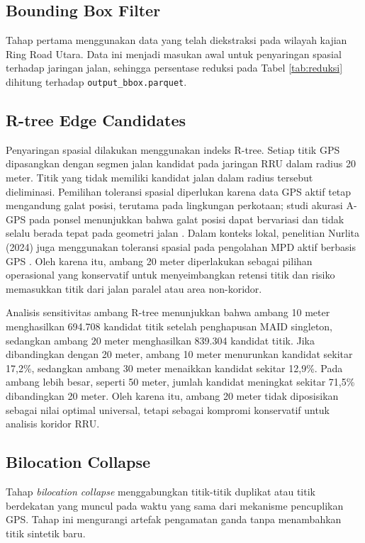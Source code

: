 \subsection{Bounding Box Filter}

Tahap pertama menggunakan data yang telah diekstraksi pada wilayah kajian Ring Road Utara. Data ini menjadi masukan awal untuk penyaringan spasial terhadap jaringan jalan, sehingga persentase reduksi pada Tabel \ref{tab:reduksi} dihitung terhadap \texttt{output\_bbox.parquet}.

\subsection{R-tree Edge Candidates}

Penyaringan spasial dilakukan menggunakan indeks R-tree. Setiap titik GPS dipasangkan dengan segmen jalan kandidat pada jaringan RRU dalam radius 20 meter. Titik yang tidak memiliki kandidat jalan dalam radius tersebut dieliminasi. Pemilihan toleransi spasial diperlukan karena data GPS aktif tetap mengandung galat posisi, terutama pada lingkungan perkotaan; studi akurasi A-GPS pada ponsel menunjukkan bahwa galat posisi dapat bervariasi dan tidak selalu berada tepat pada geometri jalan \cite{zandbergen2011}. Dalam konteks lokal, penelitian Nurlita (2024) juga menggunakan toleransi spasial pada pengolahan MPD aktif berbasis GPS \cite{nurlita2024}. Oleh karena itu, ambang 20 meter diperlakukan sebagai pilihan operasional yang konservatif untuk menyeimbangkan retensi titik dan risiko memasukkan titik dari jalan paralel atau area non-koridor.

Analisis sensitivitas ambang R-tree menunjukkan bahwa ambang 10 meter menghasilkan 694.708 kandidat titik setelah penghapusan MAID singleton, sedangkan ambang 20 meter menghasilkan 839.304 kandidat titik. Jika dibandingkan dengan 20 meter, ambang 10 meter menurunkan kandidat sekitar 17,2\%, sedangkan ambang 30 meter menaikkan kandidat sekitar 12,9\%. Pada ambang lebih besar, seperti 50 meter, jumlah kandidat meningkat sekitar 71,5\% dibandingkan 20 meter. Oleh karena itu, ambang 20 meter tidak diposisikan sebagai nilai optimal universal, tetapi sebagai kompromi konservatif untuk analisis koridor RRU.

\subsection{Bilocation Collapse}

Tahap \textit{bilocation collapse} menggabungkan titik-titik duplikat atau titik berdekatan yang muncul pada waktu yang sama dari mekanisme pencuplikan GPS. Tahap ini mengurangi artefak pengamatan ganda tanpa menambahkan titik sintetik baru.

